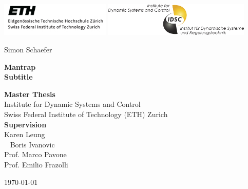 \begin{titlepage}

\pagestyle{empty}
\begin{center}

\includegraphics[height=1.6cm]{logos/eth_logo}
\hfill
\includegraphics[height=1.6cm]{logos/idsc_logo}

\vspace*{2cm}
{\large Simon Schaefer}
\vspace{2.5cm}

\begin{minipage}{15cm}
\centering
\bfseries \Huge {Mantrap} 
\\\vspace*{1cm}\Large {Subtitle}
\end{minipage}
\vspace*{4cm}


{\large \textbf{Master Thesis}} \\[3ex]
Institute for Dynamic Systems and Control\\
Swiss Federal Institute of Technology (ETH) Zurich\\

\vspace{2cm}
\textbf{Supervision} \\[1.5ex]
Karen Leung \\ 
Boris Ivanovic \\ 
Prof. Marco Pavone \\ 
Prof. Emilio Frazolli

\vfill
\today

\end{center}

\cleardoublepage %
\end{titlepage}
